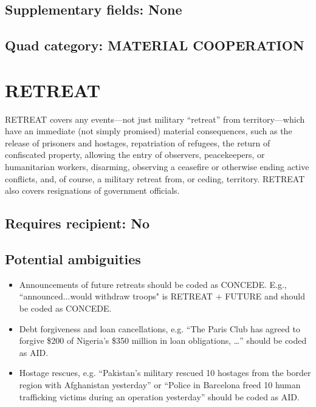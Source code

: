 \documentclass[11pt]{report}
\newcommand{\plcat}[1]{\textsf{#1}}
\begin{document}
\subsection{Supplementary fields: None}

\subsection{Quad category: MATERIAL COOPERATION}

\newpage

\section{RETREAT}

\plcat{RETREAT} covers any events---not just military ``retreat'' from territory---which have an immediate (not simply promised) material consequences, such as the release of prisoners and hostages, repatriation of refugees, the return of  confiscated property, allowing the entry of observers, peacekeepers, or humanitarian workers, disarming, observing a ceasefire or otherwise ending active conflicts, and, of course, a military retreat from, or ceding, territory. \plcat{RETREAT} also covers resignations of government officials.

\subsection{Requires recipient: No}

\subsection{Potential ambiguities}

\begin{itemize}
\item Announcements of future retreats should be coded as \plcat{CONCEDE}. E.g., ``announced...would withdraw troops" is \plcat{RETREAT} + \plcat{FUTURE} and should be coded as \plcat{CONCEDE}.
\item Debt forgiveness and loan cancellations, e.g. ``The Paris Club has agreed to forgive \$200 of Nigeria’s \$350 million in loan obligations, \dots'' should be coded as \plcat{AID}.
\item Hostage rescues, e.g. ``Pakistan’s military rescued 10 hostages from the border region with Afghanistan yesterday'' or ``Police in Barcelona freed 10 human trafficking victims during an operation yesterday'' should be coded as \plcat{AID}.
\end{itemize}
\end{document}
